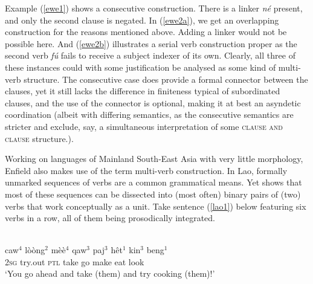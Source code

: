Example (\ref{ewe1}) shows a consecutive construction. There is a linker \textit{né} present, and only the second clause is negated. In (\ref{ewe2a}), we get an overlapping construction for the reasons mentioned above. Adding a linker would not be possible here. And (\ref{ewe2b}) illustrates a serial verb construction proper as the second verb \textit{fú} fails to receive a subject indexer of its own. Clearly, all three of these instances could with some justification be analysed as some kind of multi-verb structure. The consecutive case does provide a formal connector between the clauses, yet it still lacks the difference in finiteness typical of subordinated clauses, and the use of the connector is optional, making it at best an asyndetic coordination (albeit with differing semantics, as the consecutive semantics are stricter and exclude, say, a simultaneous interpretation of some \textsc{clause and clause} structure.). 

Working on languages of Mainland South-East Asia with very little morphology, Enfield also makes use of the term multi-verb construction. In Lao, formally unmarked sequences of verbs are a common grammatical means. Yet \citet{enfield2008verbs} shows that most of these sequences can be dissected into (most often) binary pairs of (two) verbs that work conceptually as a unit. Take sentence (\ref{lao1}) below featuring six verbs in a row, all of them being prosodically integrated.

\ea \label{lao1}
\\
\gll caw$^4$ lòòng$^2$ mèè$^4$ qaw$^3$ paj$^3$ hêt$^1$ kin$^3$ beng$^1$ \\
\textsc{2}\textsc{sg} try.out \textsc{ptl} take go make eat look \\
\glft `You go ahead and take (them) and try cooking (them)!'\\ 
\z

